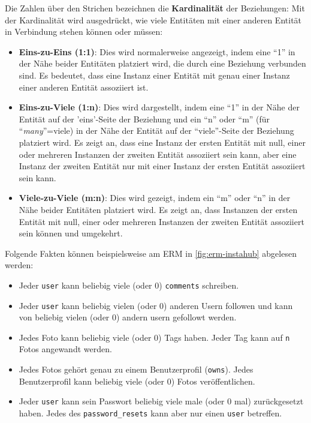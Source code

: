 Die Zahlen über den Strichen bezeichnen die \textbf{Kardinalität} der Beziehungen: Mit der Kardinalität wird ausgedrückt, wie viele Entitäten mit einer anderen Entität in Verbindung stehen können oder müssen:
\begin{itemize}
  \item \textbf{Eins-zu-Eins (1:1)}: Dies wird normalerweise angezeigt, indem eine \enquote{1} in der Nähe beider Entitäten platziert wird, die durch eine Beziehung verbunden sind. Es bedeutet, dass eine Instanz einer Entität mit genau einer Instanz einer anderen Entität assoziiert ist.
  \item \textbf{Eins-zu-Viele (1:n)}: Dies wird dargestellt, indem eine \enquote{1} in der Nähe der Entität auf der 'eins'-Seite der Beziehung und ein \enquote{n} oder \enquote{m} (für \enquote{\textit{many}}=viele) in der Nähe der Entität auf der \enquote{viele}-Seite der Beziehung platziert wird. Es zeigt an, dass eine Instanz der ersten Entität mit null, einer oder mehreren Instanzen der zweiten Entität assoziiert sein kann, aber eine Instanz der zweiten Entität nur mit einer Instanz der ersten Entität assoziiert sein kann.
  \item \textbf{Viele-zu-Viele (m:n)}: Dies wird gezeigt, indem ein \enquote{m} oder \enquote{n} in der Nähe beider Entitäten platziert wird. Es zeigt an, dass Instanzen der ersten Entität mit null, einer oder mehreren Instanzen der zweiten Entität assoziiert sein können und umgekehrt.
\end{itemize}

Folgende Fakten können beispielsweise am \gls{ERM} in \cref{fig:erm-instahub} abgelesen werden:
\begin{itemize}
  \item Jeder \texttt{user} kann beliebig viele (oder 0) \texttt{comments} schreiben.
  \item Jeder \texttt{user} kann beliebig vielen (oder 0) anderen Usern followen und kann von beliebig vielen (oder 0) andern usern gefollowt werden.
  \item Jedes Foto kann beliebig viele (oder 0) Tags haben. Jeder Tag kann auf \texttt{n} Fotos angewandt werden.
  \item Jedes Fotos gehört genau zu einem Benutzerprofil (\texttt{owns}). Jedes Benutzerprofil kann beliebig viele (oder 0) Fotos veröffentlichen.
  \item Jeder \texttt{user} kann sein Passwort beliebig viele male (oder 0 mal) zurückgesetzt haben. Jedes des \texttt{password\_resets} kann aber nur einen \texttt{user} betreffen.
\end{itemize}


